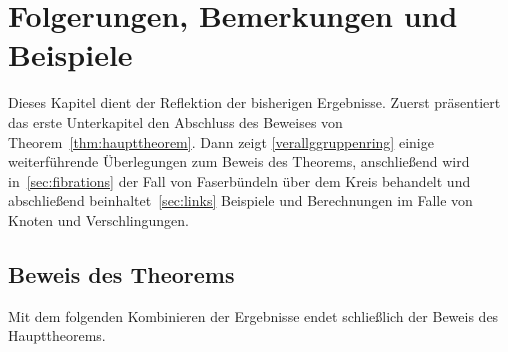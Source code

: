 
\section{Folgerungen, Bemerkungen und Beispiele}
    Dieses Kapitel dient der Reflektion der bisherigen Ergebnisse. Zuerst präsentiert das erste Unterkapitel den Abschluss des Beweises von Theorem~\ref{thm:haupttheorem}. Dann zeigt \ref{verallggruppenring} einige weiterführende Überlegungen zum Beweis des Theorems, anschließend wird in~\ref{sec:fibrations} der Fall von Faserbündeln über dem Kreis behandelt und abschließend beinhaltet~\ref{sec:links} Beispiele und Berechnungen im Falle von Knoten und Verschlingungen.

\subsection{Beweis des Theorems}

Mit dem folgenden Kombinieren der Ergebnisse endet schließlich der Beweis des Haupttheorems.

